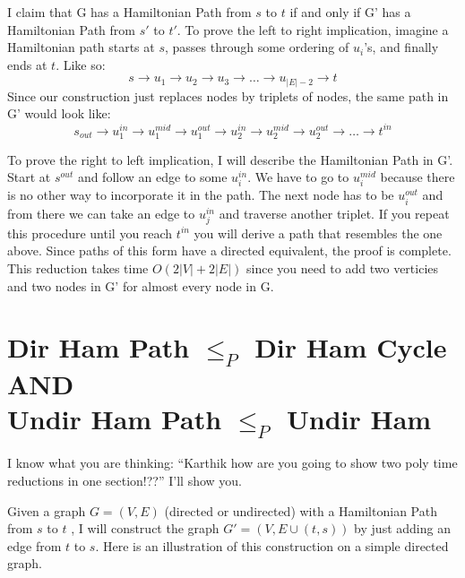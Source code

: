 \documentclass[11pt]{article}
\begin{document}
I claim that G has a Hamiltonian Path from $s$ to $t$ if and only if G' has a Hamiltonian Path from $s'$ to $t'$.
To prove the left to right implication, imagine a Hamiltonian path starts at $s$, 
passes through some ordering of $u_{i}$'s, and finally ends at $t$. Like so:
$$s \rightarrow u_{1} \rightarrow u_{2} \rightarrow u_{3} \rightarrow \dots \rightarrow u_{|E|-2} \rightarrow t$$
Since our construction just replaces nodes by triplets of nodes, the same path in G' would look 
like:
$$s_{out} \rightarrow u_{1}^{in} \rightarrow u_{1}^{mid} \rightarrow u_{1}^{out} \rightarrow u_{2}^{in} \rightarrow u_{2}^{mid} \rightarrow 
u_{2}^{out} \rightarrow \dots \rightarrow t^{in}$$

To prove the right to left implication, I will describe the Hamiltonian Path in G'. 
Start at $s^{out}$ and follow an edge to some $u_i^{in}$. We have to go to $u_i^{mid}$ 
because there is no other way to incorporate it in the path. The next node has to be
$u_i^{out}$ and from there we can take an edge to $u_j^{in}$ and traverse another triplet.
 If you repeat this procedure until you reach $t^{in}$ you will derive a path that 
resembles the one above. Since paths of this form have a directed equivalent, the proof is
complete. This reduction takes time $O(2|V| + 2|E|)$ since you need to add two verticies
and two nodes in G' for almost every node in G.

\section{Dir Ham Path $\leq_P$ Dir Ham Cycle \textbf{AND} \\ Undir Ham Path $\leq_P$ Undir Ham}
I know what you are thinking: ``Karthik how are you going to show two poly time reductions
in one section!??'' I'll show you.

Given a graph $G = (V,E)$ (directed or undirected) with a Hamiltonian Path from $s$ to $t$ , I will construct
 the graph $G' = (V,E \cup {(t,s)})$ by just adding an edge from $t$ to $s$. Here is an
illustration of this construction on a simple directed graph.
\end{document}
